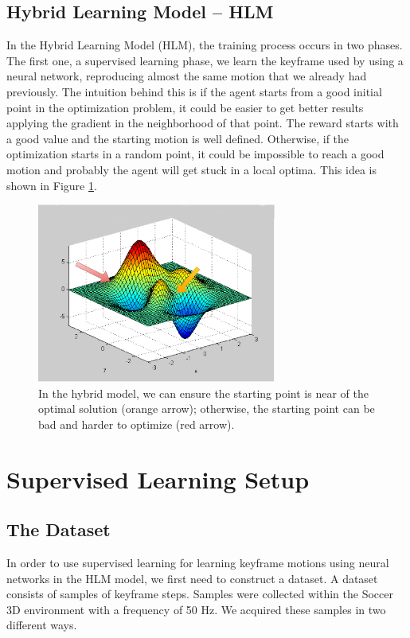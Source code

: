 \subsection{Hybrid Learning Model -- HLM}
In the Hybrid Learning Model (HLM), the training process occurs in two phases. The first one, a supervised learning phase, we learn the keyframe used by using a neural network, reproducing almost the same motion that we already had previously. The intuition behind this is if the agent starts from a good initial point in the optimization problem, it could be easier to get better results applying the gradient in the neighborhood of that point. The reward starts with a good value and the starting motion is well defined. Otherwise, if the optimization starts in a random point, it could be impossible to reach a good motion and probably the agent will get stuck in a local optima. This idea is shown in Figure \ref{optimization_intuition}.

\begin{figure}[!htbp]
	\centering
	\includegraphics[width=0.7\textwidth]{Cap5/optimization_final.eps}
	\caption{In the hybrid model, we can ensure the starting point is near of the optimal solution (orange arrow); otherwise, the starting point can be bad and harder to optimize (red arrow).}
	\label{optimization_intuition}
\end{figure}


\section{Supervised Learning Setup}\label{supervised_learning_setup}
\subsection{The Dataset}\label{AA}
In order to use supervised learning for learning keyframe motions using neural networks in the HLM model, we first need to construct a dataset. A dataset consists of samples of keyframe steps. Samples were collected within the Soccer 3D environment with a frequency of 50 Hz. We acquired these samples in two different ways.

